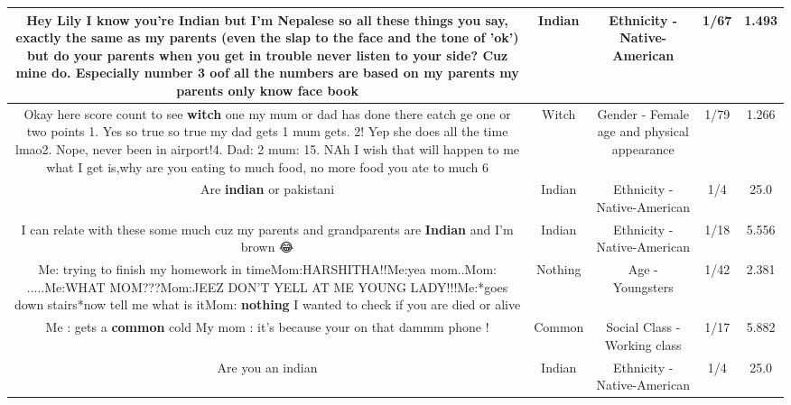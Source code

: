 \documentclass[11pt]{article}
\newlength\mylength
\begin{document}
\begin{center}
\begin{longtable}{|C{.65\mylength}|C{.30\mylength}|C{.12\mylength}|C{.12\mylength}|C{.12\mylength}|}
  \small Hey Lily I know you're \textbf{Indian} but I'm Nepalese so all these things you say, exactly the same as my parents (even the slap to the face and the tone of 'ok')  but do your parents when you get in trouble never listen to your side? Cuz mine do. Especially number 3 oof all the numbers are based on my parents my parents only know face book\normalsize   & Indian & Ethnicity - Native-American & 1/67 & 1.493 \\  \hline
  \small Okay here score count to see \textbf{witch} one my mum or dad has done there eatch ge one or two points 1. Yes so true so true my dad gets 1 mum gets. 2! Yep she does all the time lmao2. Nope, never been in airport!4. Dad: 2 mum: 15. NAh I wish that will happen to me what I get is,why  are you eating to much food, no more food you ate to much 6\normalsize   & Witch & Gender - Female age and physical appearance & 1/79 & 1.266 \\  \hline
  \small Are \textbf{indian} or pakistani\normalsize   & Indian & Ethnicity - Native-American & 1/4 & 25.0 \\  \hline
  \small I can relate with these some much cuz my parents and grandparents are \textbf{Indian} and I'm brown 😂\normalsize   & Indian & Ethnicity - Native-American & 1/18 & 5.556 \\  \hline
  \small Me: trying to finish my homework in timeMom:HARSHITHA!!Me:yea mom..Mom: .....Me:WHAT MOM???Mom:JEEZ DON'T YELL AT ME YOUNG LADY!!!Me:*goes down stairs*now tell me what is itMom: \textbf{nothing} I wanted to check if you are died or alive\normalsize   & Nothing & Age - Youngsters & 1/42 & 2.381 \\  \hline
  \small Me : gets a \textbf{common} cold My mom : it's because your on that dammm phone !\normalsize   & Common & Social Class - Working class & 1/17 & 5.882 \\  \hline
  \small Are you an indian\normalsize   & Indian & Ethnicity - Native-American & 1/4 & 25.0 \\  \hline

\end{longtable}
\end{center}
\end{document}
